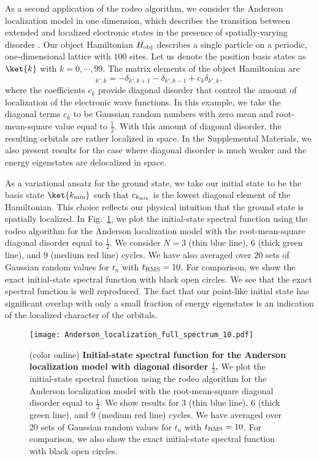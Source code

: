 As a second application of the rodeo algorithm, we consider the Anderson localization model in one dimension, which describes the transition between extended and localized electronic states in the presence of spatially-varying disorder \cite{Anderson:1958vr,Abrahams:1979zz}.  Our object Hamiltonian $H_{\rm obj}$ describes a single particle on a periodic, one-dimensional lattice with $100$ sites.  Let us denote the position basis states as $\ket{k}$ with $k=0,\cdots,99$.  The matrix elements of the object Hamiltonian are 
\begin{equation}
   [H_{\rm obj}]_{k',k}=-\delta_{k',k+1} - \delta_{k',k-1} + c_{k}\delta_{k',k},
\end{equation} 
where the coefficients $c_k$ provide diagonal disorder that control the amount of localization of the electronic wave functions.  In this example, we take the diagonal terms $c_k$ to be Gaussian random numbers with zero mean and root-mean-square value equal to $\tfrac{1}{2}$.  With this amount of diagonal disorder, the resulting orbitals are rather localized in space.  In the Supplemental Materials, we also present results for the case where diagonal disorder is much weaker and the energy eigenstates are delocalized in space.

As a variational ansatz for the ground state, we take our initial state to be the basis state $\ket{k_{\rm min}}$ such that $c_{k_{\rm min}}$ is the lowest diagonal element of the Hamiltonian.  This choice reflects our physical intuition that the ground state is spatially localized.  In Fig.~\ref{Anderson_spectrum}, we plot the initial-state spectral function using the rodeo algorithm for the Anderson localization model with the root-mean-square diagonal disorder equal to $\tfrac{1}{2}$.  We consider $N=3$ (thin blue line), $6$ (thick green line), and $9$ (medium red line) cycles. We have also averaged over $20$ sets of Gaussian random values for $t_n$ with $t_{\rm RMS}=10$.  For comparison, we show the exact initial-state spectral function with black open circles.  We see that the exact spectral function is well reproduced.  The fact that our point-like initial state has significant overlap with only a small fraction of energy eigenstates is an indication of the localized character of the orbitals.


\begin{figure}
\centering
\texttt{[image: Anderson\_localization\_full\_spectrum\_10.pdf]}
\caption{(color online) {\bf Initial-state spectral function for the Anderson localization model with diagonal disorder $\tfrac{1}{2}$.} We plot the initial-state spectral function using the rodeo algorithm for the Anderson localization model with the root-mean-square diagonal disorder equal to $\tfrac{1}{2}$.  We show results for $3$ (thin blue line), $6$ (thick green line), and $9$ (medium red line) cycles. We have averaged over $20$ sets of Gaussian random values for $t_n$ with $t_{\rm RMS}=10$.  For comparison, we also show the exact initial-state spectral function with black open circles.}
\label{Anderson_spectrum}
\end{figure} 


